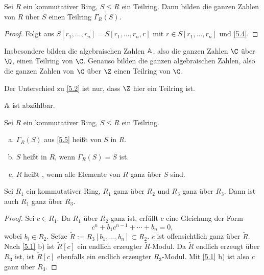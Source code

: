 \begin{kor} \label{5.5}
	Sei $R$ ein kommutativer Ring, $S \le R$ ein Teilring.
	Dann bilden die ganzen Zahlen von $R$ über $S$ einen Teilring $\Gamma_R(S)$.
	\begin{proof}
		Folgt aus $S[r_1, \dotsc, r_n] = S[r_1, \dotsc, r_n, r]$ mit $r \in S[r_1, \dotsc, r_n]$ und \ref{5.4}.
	\end{proof}
	\begin{note}
		Insbesondere bilden die algebraischen Zahlen $\mathbb{A}$, also die ganzen Zahlen $\C$ über $\Q$, einen Teilring von $\C$.
		Genauso bilden die ganzen algebraischen Zahlen, also die ganzen Zahlen von $\C$ über $\Z$ einen Teilring von $\C$.

		Der Unterschied zu \ref{5.2} ist nur, dass $\Z$ hier ein Teilring ist.

		$\mathbb{A}$ ist abzählbar.
	\end{note}
\end{kor}


\begin{df} \label{5.6}
	Sei $R$ ein kommutativer Ring, $S \le R$ ein Teilring.
	\begin{enumerate}[a)]
		\item
			$\Gamma_R(S)$ aus \ref{5.5} heißt  von $S$ in $R$.
		\item
			$S$ heißt  in $R$, wenn $\Gamma_R(S) = S$ ist.
		\item
			$R$ heißt , wenn alle Elemente von $R$ ganz über $S$ sind.
	\end{enumerate}
\end{df}

\begin{nt} \label{5.7}
	Sei $R_1$ ein kommutativer Ring, $R_1$ ganz über $R_2$ und $R_3$ ganz über $R_3$.
	Dann ist auch $R_1$ ganz über $R_3$.
	\begin{proof}
		Sei $c \in R_1$.
		Da $R_1$ über $R_2$ ganz ist, erfüllt $c$ eine Gleichung der Form
		\[
			c^n + b_1 c^{n-1} + \dotsb + b_n = 0,
		\]
		wobei $b_i \in R_2$.
		Setze $\tilde R := R_3[b_1, \dotsc, b_n] \subset R_2$.
		$c$ ist offensichtlich ganz über $\tilde R$.
		Nach \ref{5.1} b) ist $\tilde R[c]$ ein endlich erzeugter $\tilde R$-Modul.
		Da $\tilde R$ endlich erzeugt über $R_3$ ist, ist $\tilde R[c]$ ebenfalls ein endlich erzeugter $R_3$-Modul.
		Mit \ref{5.1} b) ist also $c$ ganz über $R_3$.
	\end{proof}
\end{nt}

